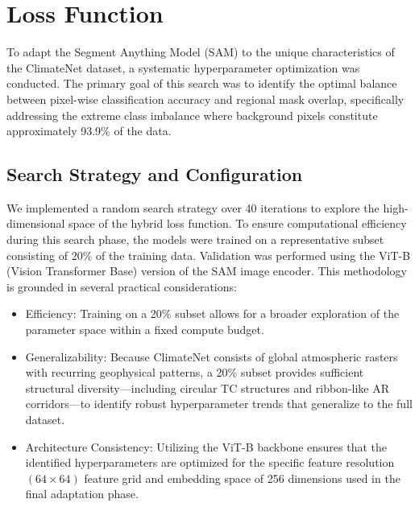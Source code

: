 \section{Loss Function}
To adapt the Segment Anything Model (SAM) to the unique characteristics of the ClimateNet dataset, a systematic hyperparameter optimization was conducted. The primary goal of this search was to identify the optimal balance between pixel-wise classification accuracy and regional mask overlap, specifically addressing the extreme class imbalance where background pixels constitute approximately 93.9\% of the data.

\subsection*{Search Strategy and Configuration}\label{searchstrat}  

We implemented a random search strategy over 40 iterations to explore the high-dimensional space of the hybrid loss function. To ensure computational efficiency during this search phase, the models were trained on a representative subset consisting of 20\% of the training data. Validation was performed using the ViT-B (Vision Transformer Base) version of the SAM image encoder. 
This methodology is grounded in several practical considerations:

\begin{itemize}
\item Efficiency: Training on a 20\% subset allows for a broader exploration of the parameter space within a fixed compute budget.
\item Generalizability: Because ClimateNet consists of global atmospheric rasters with recurring geophysical patterns, a 20\% subset provides sufficient structural diversity—including circular TC structures and ribbon-like AR corridors—to identify robust hyperparameter trends that generalize to the full dataset.
\item Architecture Consistency: Utilizing the ViT-B backbone ensures that the identified hyperparameters are optimized for the specific feature resolution $(64 \times 64)$ feature grid and embedding space of 256 dimensions used in the final adaptation phase.
\end{itemize}

